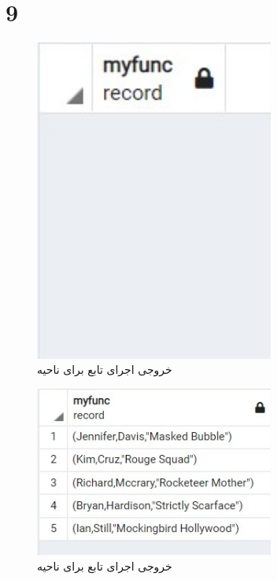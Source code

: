 \documentclass{article}
\begin{document}
\section{9}
\begin{figure}[H]
    \centering
    \includegraphics[width=0.7\textwidth]{figures/9-a.jpg}
    \caption
	{
خروجی اجرای تابع برای ناحیه 
	}
    \label{fig:fig1}
\end{figure}
\begin{figure}[H]
    \centering
    \includegraphics[width=0.7\textwidth]{figures/9-b.jpg}
    \caption
	{
خروجی اجرای تابع برای ناحیه 
	}
    \label{fig:fig1}
\end{figure}
\end{document}
